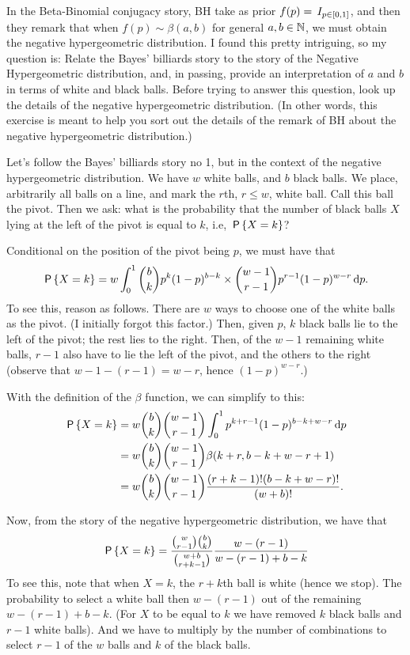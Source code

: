 \begin{exercise}
In the Beta-Binomial conjugacy story, BH take as prior $f(p) = \1{p\in [0,1]}$, and then they remark that when $f(p) \sim \beta(a,b)$ for general $a, b \in \N$, we must obtain the negative hypergeometric distribution.
I found this pretty intriguing, so my question is: Relate the Bayes' billiards story to the story of the Negative Hypergeometric distribution, and, in passing, provide an interpretation of $a$ and $b$ in terms of white and black balls.
Before trying to answer this question, look up the details of the negative hypergeometric distribution.
(In other words, this exercise is meant to help you sort out the details of the remark of BH about the negative hypergeometric distribution.)
\begin{solution}
  Let's follow the Bayes' billiards story no 1, but in the context of the negative hypergeometric distribution.
  We have $w$ white balls, and $b$ black balls.
  We place, arbitrarily all balls on a line, and mark the $r$th, $r\leq w$, white ball.
  Call this ball the pivot.
  Then we ask:  what is the probability that the number of black balls $X$ lying at the left of the pivot is equal to $k$, i.e, $\P{X=k}$?

Conditional on the position of the pivot being $p$, we must have that
\begin{equation}
\label{eq:3}
\P{X=k} = w \int_0^1{b \choose k} p^k(1-p)^{b-k} \times {w -1 \choose r-1}p^{r-1} (1-p)^{w-r} \d p.
\end{equation}
To see this, reason as follows.
There are $w$ ways to choose one of the white balls as the pivot.
(I initially forgot this factor.)
Then, given $p$, $k$ black balls lie to the left of the pivot; the rest lies to the right.
Then, of the $w-1$ remaining white balls, $r-1$ also have to lie the left of the pivot, and the others to the right (observe that $w-1 - (r-1) = w -r$, hence $(1-p)^{w-r}$.)

With the definition of the  $\beta$ function, we can simplify to this:
\begin{align}
\label{eq:3}
\P{X=k}
&= w{b \choose k} {w -1 \choose r-1}  \int_0^1 p^{k+r-1}(1-p)^{b-k+w-r} \d p \\
&= w{b \choose k} {w -1 \choose r-1}  \beta(k+r, b-k+w-r + 1)\\
&= w{b \choose k} {w -1 \choose r-1} \frac{(r+k-1)! (b-k+w-r)!}{(w+b)!}.
\end{align}

Now, from the story of the negative hypergeometric distribution, we have that
\begin{align}
\P{X=k}
&= \frac{{w \choose r-1}{b \choose k}}{{w+b \choose r+k -1}}\frac{w-(r-1)}{w -(r-1) +b-k} \\
\end{align}
To see this, note that when $X=k$, the $r+k$th ball is white (hence we stop).
The probability to select a white ball then $w-(r-1)$ out of the remaining $w-(r-1) + b-k$.
(For $X$ to be equal to $k$ we have removed $k$ black balls and $r-1$ white balls).
And we have to multiply by the number of combinations to select $r-1$ of the $w$ balls and $k$ of the black balls.



\end{solution}
\end{exercise}
